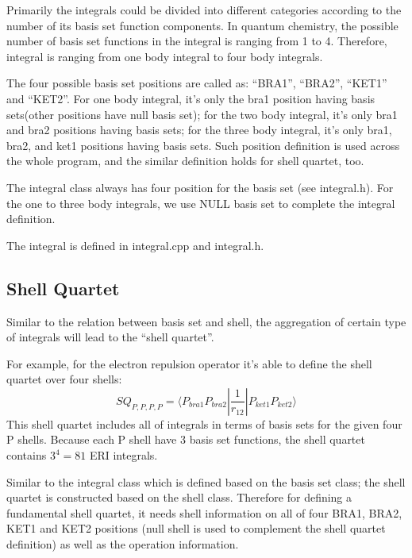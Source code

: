 Primarily the integrals could be divided into different categories according 
to the number of its basis set function components. In quantum chemistry, 
the possible number of basis set functions in the integral is ranging 
from 1 to 4. Therefore, integral is ranging from one body integral to 
four body integrals. 

The four possible basis set positions are called as: ``BRA1'', ``BRA2'',
``KET1'' and ``KET2''. For one body integral, it's only the bra1
position having basis sets(other positions have null basis set); 
for the two body integral, it's only bra1 and bra2 positions having 
basis sets; for the three body integral, 
it's only bra1, bra2, and ket1 positions having basis sets. 
Such position definition is used across the whole program, and the 
similar definition holds for shell quartet, too.

The integral class always has four position for the basis set (see 
integral.h). For the one to three body integrals, we use NULL
basis set to complete the integral definition.

The integral is defined in integral.cpp and integral.h.
\subsection{Shell Quartet}
%
%
\label{shell_quartet}
Similar to the relation between basis set and shell, the aggregation 
of certain type of integrals will lead to the ``shell quartet''.

For example, for the electron repulsion operator it's able to define 
the shell quartet over four shells:
\begin{equation}
 SQ_{P,P,P,P} = \langle P_{bra1}P_{bra2}|
 \frac{1}{r_{12}}|P_{ket1}P_{ket2} \rangle
\end{equation}
This shell quartet includes all of integrals in terms of basis sets
for the given four P shells. Because each P shell have 3 basis set
functions, the shell quartet contains $3^{4} = 81$ ERI integrals.

Similar to the integral class which is defined based on the basis set
class; the shell quartet is constructed based on the shell class. Therefore
for defining a fundamental shell quartet, it needs shell information
on all of four BRA1, BRA2, KET1 and KET2 positions (null shell is used
to complement the shell quartet definition) as well as the operation
information.

